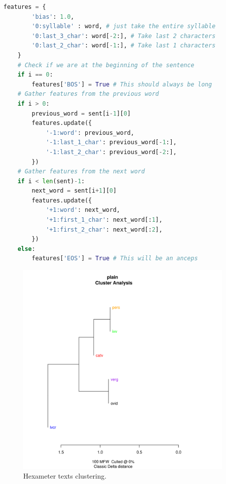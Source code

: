 \begin{lstlisting}[language=Python, caption=Python example]
    features = {
        'bias': 1.0,
        '0:syllable' : word, # just take the entire syllable
        '0:last_3_char': word[-2:], # Take last 2 characters
        '0:last_2_char': word[-1:], # Take last 1 characters
    }
    # Check if we are at the beginning of the sentence
    if i == 0:
        features['BOS'] = True # This should always be long
    # Gather features from the previous word
    if i > 0:
        previous_word = sent[i-1][0]
        features.update({
            '-1:word': previous_word,
            '-1:last_1_char': previous_word[-1:],
            '-1:last_2_char': previous_word[-2:],
        })
    # Gather features from the next word
    if i < len(sent)-1:
        next_word = sent[i+1][0]
        features.update({
            '+1:word': next_word,
            '+1:first_1_char': next_word[:1],
            '+1:first_2_char': next_word[:2],
        })
    else:
        features['EOS'] = True # This will be an anceps
\end{lstlisting}


\begin{figure}[H]
    \centering
    \includegraphics[width=0.95\textwidth]{img/hexameter_kestemont_tree.png}

    \caption{Hexameter texts clustering.}
    \label{fig:exp_architecture}
\end{figure}

